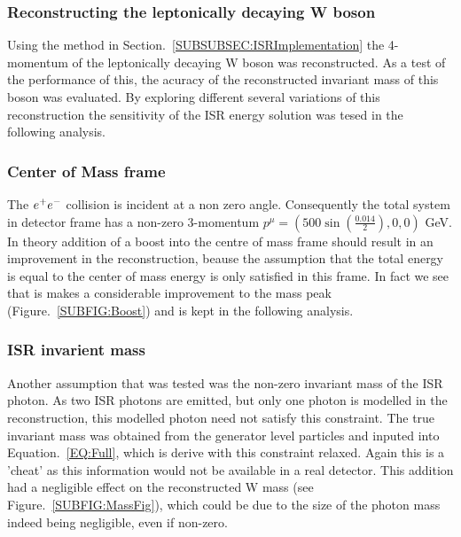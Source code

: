 \subsubsection{Reconstructing the leptonically decaying W boson}
\label{SUBSUBSEC:ISREvaluation}
Using the method in Section.~\ref{SUBSUBSEC:ISRImplementation} the 4-momentum of the leptonically decaying W boson was reconstructed. As a test of the performance of this, the acuracy of the reconstructed invariant mass of this boson was evaluated. By exploring different several variations of this reconstruction the sensitivity of the ISR energy solution was tesed in the following analysis.

\subsubsection{Center of Mass frame}
\label{SUBSUBSEC:CenterOfMassFrame}
The $e^{+}e^{-}$ collision is incident at a non zero angle. Consequently the total system in detector frame has a non-zero 3-momentum $ {p}^{\mu} = ( 500 \sin{(\frac{0.014}{2})}, 0, 0 )$ GeV. In theory addition of a boost into the centre of mass frame should result in an improvement in the reconstruction, beause the assumption that the total energy is equal to the center of mass energy is only satisfied in this frame. In fact we see that is makes a considerable improvement to the mass peak (Figure.~\ref{SUBFIG:Boost}) and is kept in the following analysis.

\subsubsection{ISR invarient mass}
\label{SUBSUBSEC:ISRInvarientMass}
Another assumption that was tested was the non-zero invariant mass of the ISR photon. As two ISR photons are emitted, but only one photon is modelled in the reconstruction, this modelled photon need not satisfy this constraint. The true invariant mass was obtained from the generator level particles and inputed into Equation.~\ref{EQ:Full}, which is derive with this constraint relaxed. Again this is a 'cheat' as this information would not be available in a real detector. This addition had a negligible effect on the reconstructed W mass (see Figure.~\ref{SUBFIG:MassFig}), which could be due to the size of the photon mass indeed being negligible, even if non-zero.

